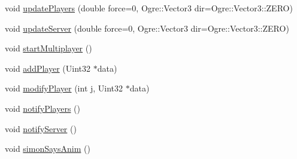 \begin{DoxyCompactItemize}
\item 
void \hyperlink{classTileGame_a9b89da15c9725ec718bc294119841043}{update\-Players} (double force=0, Ogre\-::\-Vector3 dir=Ogre\-::\-Vector3\-::\-Z\-E\-R\-O)
\item 
void \hyperlink{classTileGame_ad4923a2d2eace2ebf9c9d38728c3e181}{update\-Server} (double force=0, Ogre\-::\-Vector3 dir=Ogre\-::\-Vector3\-::\-Z\-E\-R\-O)
\item 
void \hyperlink{classTileGame_a1ee23b22f33fa11b9bb4854d16d19653}{start\-Multiplayer} ()
\item 
void \hyperlink{classTileGame_a41c96eb8d5df658a523723a90500a5ff}{add\-Player} (Uint32 $\ast$data)
\item 
void \hyperlink{classTileGame_afd1851188c581afc0f1846104c6ce7da}{modify\-Player} (int j, Uint32 $\ast$data)
\item 
void \hyperlink{classTileGame_a60decbb2167d26695a7eb7c50c7effa1}{notify\-Players} ()
\item 
void \hyperlink{classTileGame_a433bc18f76fb4c0b4465c638696ffe3c}{notify\-Server} ()
\item 
void \hyperlink{classTileGame_aabd8c2eb7913022c30119846d57eaba5}{simon\-Says\-Anim} ()
\end{DoxyCompactItemize}
